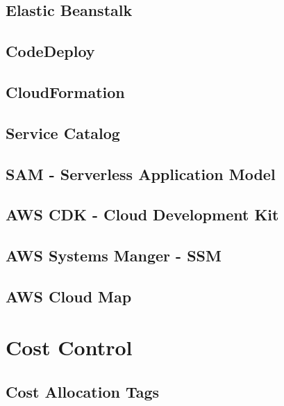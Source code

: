 \documentclass[11pt]{book}
\begin{document}
    \section{Elastic Beanstalk}


    \section{CodeDeploy}


    \section{CloudFormation}


    \section{Service Catalog}


    \section{SAM - Serverless Application Model}


    \section{AWS CDK - Cloud Development Kit}


    \section{AWS Systems Manger - SSM}


    \section{AWS Cloud Map}


    \chapter{Cost Control}


    \section{Cost Allocation Tags}
\end{document}
